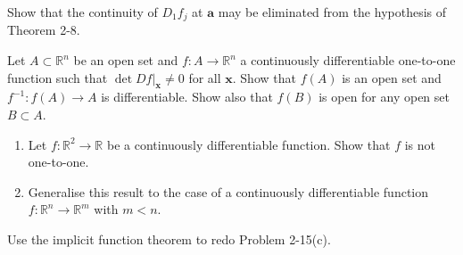 \documentclass[12 pt, letterpaper]{hmcpset}
\begin{document}
\pagebreak

\begin{problem}[33.]
	Show that the continuity of $D_{1} f_{j}$ at $\mathbf{a}$ may be eliminated from the hypothesis of Theorem 2-8.
\end{problem}

\pagebreak

\begin{problem}[36.]
	Let $A \subset \mathbb{R}^{n}$ be an open set and $f : A \to \mathbb{R}^{n}$ a continuously differentiable one-to-one function such that $\det Df \Big |_{\mathbf{x}} \neq 0$ for all $\mathbf{x}$. Show that $f(A)$ is an open set and $f^{-1} : f(A) \to A$ is differentiable. Show also that $f(B)$ is open for any open set $B \subset A$.
\end{problem}

\pagebreak

\begin{problem}[37.]
	\begin{enumerate}
		\item Let $f : \mathbb{R}^{2} \to \mathbb{R}$ be a continuously differentiable function. Show that $f$ is not one-to-one.
		\item Generalise this result to the case of a continuously differentiable function $f : \mathbb{R}^{n} \to \mathbb{R}^{m}$ with $m < n$.
	\end{enumerate}
\end{problem}

\pagebreak

\begin{problem}[40.]
	Use the implicit function theorem to redo Problem 2-15(c).
\end{problem}
\end{document}
